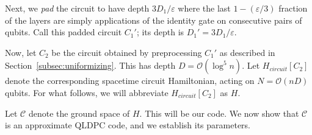 \documentclass[11pt,letterpaper]{article}
\theoremstyle{definition}
\theoremstyle{remark}
\newcommand{\cC}{\mathcal C}
\let\epsilon=\varepsilon
\numberwithin{equation}{section}
\newcommand{\eps}{\epsilon}
\theoremstyle{definition}
\begin{document}
Next, we \emph{pad} the circuit to have depth $3 D_1/\eps$ where the last $1 - (\eps/3)$ fraction of the layers are simply applications of the identity gate on consecutive pairs of qubits. Call this padded circuit $C_1'$; its depth is $D_1' = 3 D_1/\eps$. 

%

Now, let $C_2$ be the circuit obtained by preprocessing $C_1'$ as described in Section~\ref{subsec:uniformizing}. 
%
This has depth $D = \mathcal{O}(\log^5 n)$. Let $H_{circuit}[C_2]$ denote the corresponding spacetime circuit Hamiltonian, acting on $N = \mathcal{O}(nD)$ qubits. For what follows, we will abbreviate $H_{circuit}[C_2]$ as $H$. 

Let $\cC$ denote the ground space of $H$. This will be our code. We now show that $\cC$ is an approximate QLDPC code, and we establish its parameters. 

%

%


%

%

%
\end{document}
